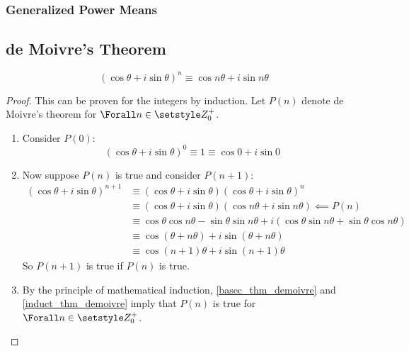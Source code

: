 \subsubsection{Generalized Power Means}

\subsection{de Moivre's Theorem}

\begin{theorem}
 \begin{equation*}
  (\cos \theta + i \sin \theta)^n \equiv \cos n\theta + i \sin n\theta
 \end{equation*}
\end{theorem}
\begin{proof}
 This can be proven for the integers by induction. Let \(P(n)\) denote de
 Moivre's theorem for \(\Forall n \in \Integers_0^+\).
 \begin{enumerate}[label=\Roman*.]
  \item \label{basec_thm_demoivre} Consider \(P(0)\):
        \begin{equation*}
         (\cos \theta + i \sin \theta)^0 \equiv 1 \equiv \cos 0 + i \sin 0
        \end{equation*}
  \item \label{induct_thm_demoivre} Now suppose \(P(n)\) is true and consider
        \(P(n + 1)\):
        \begin{align*}
         (\cos \theta + i \sin \theta)^{n + 1} &\equiv
          (\cos \theta + i \sin \theta)(\cos \theta + i \sin \theta)^n \\
          &\equiv (\cos \theta + i \sin \theta)
                  (\cos n\theta + i \sin n\theta) \impliedby P(n) \\
          &\equiv \cos \theta \cos n\theta - \sin \theta \sin n\theta
                + i(\cos \theta \sin n\theta + \sin \theta \cos n\theta) \\
          &\equiv \cos(\theta + n\theta) + i \sin(\theta + n\theta) \\
          &\equiv \cos (n + 1)\theta + i \sin (n + 1)\theta
        \end{align*}
        So \(P(n + 1)\) is true if \(P(n)\) is true.
  \item By the principle of mathematical induction, \ref{basec_thm_demoivre} and
        \ref{induct_thm_demoivre} imply that \(P(n)\) is true for
        \(\Forall n \in \Integers_0^+\).
 \end{enumerate}
\end{proof}

